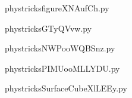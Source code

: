     

    \clearpage
    


    \newcommand{\CaptionFigfigureXNAufCh}{<+Type your caption here+>}
    \begin{center}
        
    \end{center}
    phystricksfigureXNAufCh.py

    

    \clearpage
    


    \newcommand{\CaptionFigGTyQVvw}{<+Type your caption here+>}
    \begin{center}
        
    \end{center}
    phystricksGTyQVvw.py

    

    \clearpage
    


    \newcommand{\CaptionFigNWPooWQBSnz}{<+Type your caption here+>}
    \begin{center}
        
    \end{center}
    phystricksNWPooWQBSnz.py

    

    \clearpage
    


    \newcommand{\CaptionFigPIMUooMLLYDU}{<+Type your caption here+>}
    \begin{center}
        
    \end{center}
    phystricksPIMUooMLLYDU.py

    

    \clearpage
    


    \newcommand{\CaptionFigSurfaceCubeXlLEEy}{<+Type your caption here+>}
    \begin{center}
        
    \end{center}
    phystricksSurfaceCubeXlLEEy.py

    

    \clearpage
    


